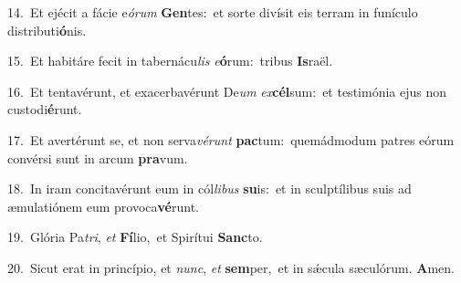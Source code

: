 {\numbfont\textcolor{\numbcolor}{14.}}~Et ejécit a fácie e\-\textit{ó}\-\textit{rum} \textbf{Gen}\-tes:~\star et sorte divísit eis terram in funículo distributi\-\textbf{ó}\-nis.\par
{\numbfont\textcolor{\numbcolor}{15.}}~Et habitáre fecit in tabernácu\textit{lis} \textit{e}\-\textbf{ó}rum:~\star tribus \textbf{Is}\-raël.\par
{\numbfont\textcolor{\numbcolor}{16.}}~Et tentavérunt, et exacerbavérunt De\textit{um} \textit{ex}\-\textbf{cél}sum:~\star et testimónia ejus non custodi\-\textbf{é}\-runt.\par
{\numbfont\textcolor{\numbcolor}{17.}}~Et avertérunt se, et non serva\-\textit{vé}\-\textit{runt} \textbf{pac}\-tum:~\star quemádmodum patres eórum convérsi sunt in arcum \textbf{pra}\-vum.\par
{\numbfont\textcolor{\numbcolor}{18.}}~In iram concitavérunt eum in cól\-\textit{li}\-\textit{bus} \textbf{su}\-is:~\star et in sculptílibus suis ad æmulatiónem eum provoca\-\textbf{vé}\-runt.\par
{\numbfont\textcolor{\numbcolor}{19.}}~Glória Pa\-\textit{tri}\-, \textit{et} \textbf{Fí}\-lio,~\star et Spirítui \textbf{Sanc}\-to.\par
{\numbfont\textcolor{\numbcolor}{20.}}~Sicut erat in princípio, et \textit{nunc}\-, \textit{et} \textbf{sem}\-per,~\star et in sǽcula sæculórum. \textbf{A}\-men.\par

